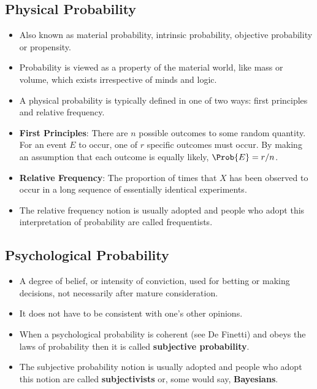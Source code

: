 \subsection*{Physical Probability}
\begin{itemize}
      \item Also known as material probability, intrinsic probability, objective
            probability or propensity.
      \item Probability is viewed as a property of the material world, like mass or
            volume, which exists irrespective of minds and logic.
      \item A physical probability is typically defined in one of two ways: first
            principles and relative frequency.
      \item \textbf{First Principles}:
            There are $n$ possible outcomes to some random quantity. For an event
            $E$ to occur, one of $r$ specific outcomes must occur. By making an
            assumption that each outcome is equally likely, $ \Prob{E}=r/n $.
      \item \textbf{Relative Frequency}:
            The proportion of times that $X$ has been observed to occur in a long
            sequence of essentially identical experiments.
      \item The relative frequency notion is usually adopted and people who adopt
            this interpretation of probability are called frequentists.
\end{itemize}
\subsection*{Psychological Probability}
\begin{itemize}
      \item A degree of belief, or intensity of conviction, used for betting or making
            decisions, not necessarily after mature consideration.
      \item It does not have to be consistent with one's other opinions.
      \item When a psychological probability is coherent (see De Finetti) and obeys
            the laws of probability then it is called \textbf{subjective probability}.
      \item The subjective probability notion is usually adopted and people who
            adopt this notion are called \textbf{subjectivists} or, some would say, \textbf{Bayesians}.
\end{itemize}
